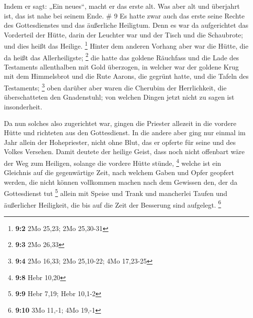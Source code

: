  Indem er sagt: „Ein neues``, macht er das erste alt. Was
aber alt und überjahrt ist, das ist nahe bei seinem Ende. \# 9
 Es hatte zwar auch das erste seine Rechte des
Gottesdienstes und das äußerliche Heiligtum.  Denn es war da
aufgerichtet das Vorderteil der Hütte, darin der Leuchter war und der
Tisch und die Schaubrote; und dies heißt das Heilige. \footnote{\textbf{9:2}
  2Mo 25,23; 2Mo 25,30-31}  Hinter dem anderen Vorhang aber
war die Hütte, die da heißt das Allerheiligste; \footnote{\textbf{9:3}
  2Mo 26,33}  die hatte das goldene Räuchfass und die Lade
des Testaments allenthalben mit Gold überzogen, in welcher war der
goldene Krug mit dem Himmelsbrot und die Rute Aarons, die gegrünt hatte,
und die Tafeln des Testaments; \footnote{\textbf{9:4} 2Mo 16,33; 2Mo
  25,10-22; 4Mo 17,23-25}  oben darüber aber waren die
Cherubim der Herrlichkeit, die überschatteten den Gnadenstuhl; von
welchen Dingen jetzt nicht zu sagen ist insonderheit.

 Da nun solches also zugerichtet war, gingen die Priester
allezeit in die vordere Hütte und richteten aus den Gottesdienst.
 In die andere aber ging nur einmal im Jahr allein der
Hohepriester, nicht ohne Blut, das er opferte für seine und des Volkes
Versehen.  Damit deutete der heilige Geist, dass noch nicht
offenbart wäre der Weg zum Heiligen, solange die vordere Hütte stünde,
\footnote{\textbf{9:8} Hebr 10,20}  welche ist ein Gleichnis
auf die gegenwärtige Zeit, nach welchem Gaben und Opfer geopfert werden,
die nicht können vollkommen machen nach dem Gewissen den, der da
Gottesdienst tut \footnote{\textbf{9:9} Hebr 7,19; Hebr 10,1-2}
 allein mit Speise und Trank und mancherlei Taufen und
äußerlicher Heiligkeit, die bis auf die Zeit der Besserung sind
aufgelegt. \footnote{\textbf{9:10} 3Mo 11,-1; 4Mo 19,-1}

